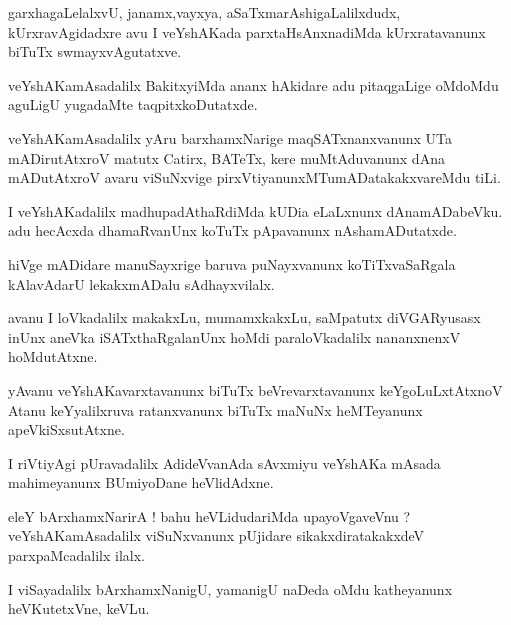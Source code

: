 \documentclass{article}
\begin{document}
\begin{mn}%
garxhagaLelalxvU, janamx,vayxya, aSaTxmarAshigaLalilxdudx, kUrxravAgidadxre avu I 
veYshAKada parxtaHsAnxnadiMda kUrxratavanunx biTuTx swmayxvAgutatxve.
\end{mn}

\begin{mn}%
veYshAKamAsadalilx BakitxyiMda ananx hAkidare adu pitaqgaLige oMdoMdu aguLigU yugadaMte 
taqpitxkoDutatxde.
\end{mn}

\begin{mn}%
veYshAKamAsadalilx yAru barxhamxNarige maqSATxnanxvanunx UTa mADirutAtxroV matutx Catirx, 
BATeTx, kere muMtAduvanunx dAna mADutAtxroV avaru viSuNxvige 
pirxVtiyanunxMTumADatakakxvareMdu tiLi.
\end{mn}

\begin{mn}%
I veYshAKadalilx madhupadAthaRdiMda kUDia eLaLxnunx dAnamADabeVku. adu hecAcxda 
dhamaRvanUnx koTuTx pApavanunx nAshamADutatxde.
\end{mn}

\begin{mn}%
hiVge mADidare manuSayxrige baruva puNayxvanunx koTiTxvaSaRgala kAlavAdarU lekakxmADalu 
sAdhayxvilalx.
\end{mn}

\begin{mn}%
avanu I loVkadalilx makakxLu, mumamxkakxLu, saMpatutx diVGARyusasx inUnx aneVka 
iSATxthaRgalanUnx hoMdi paraloVkadalilx nananxnenxV hoMdutAtxne.
\end{mn}

\begin{mn}%
yAvanu veYshAKavarxtavanunx biTuTx beVrevarxtavanunx keYgoLuLxtAtxnoV Atanu keYyalilxruva 
ratanxvanunx biTuTx maNuNx heMTeyanunx apeVkiSxsutAtxne.
\end{mn}

\begin{mn}%
I riVtiyAgi pUravadalilx AdideVvanAda sAvxmiyu veYshAKa mAsada mahimeyanunx BUmiyoDane 
heVlidAdxne.
\end{mn}

\begin{mn}%
eleY bArxhamxNarirA ! bahu heVLidudariMda upayoVgaveVnu ? veYshAKamAsadalilx viSuNxvanunx 
pUjidare sikakxdiratakakxdeV parxpaMcadalilx ilalx.
\end{mn}

\begin{mn}%
I viSayadalilx bArxhamxNanigU, yamanigU naDeda oMdu katheyanunx heVKutetxVne, keVLu.
\end{mn}
\end{document}
